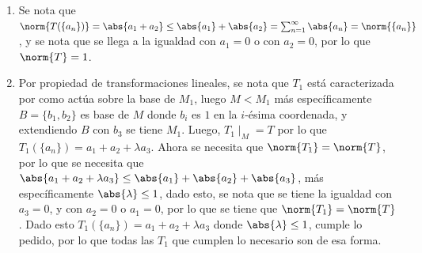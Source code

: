 \begin{sol}
    \begin{enumerate}
        \item Se nota que \(\norm{T(\{a_n\})}=\abs{a_1+a_2}\leq\abs{a_1}+\abs{a_2}=\sum_{n=1}^\infty\abs{a_n}=\norm{\{a_n\}}\), y se nota que se llega a la igualdad con \(a_1=0\) o con \(a_2=0\), por lo que \(\norm{T}=1\).
        \item Por propiedad de transformaciones lineales, se nota que \(T_1\) está caracterizada por como actúa sobre la base de \(M_1\), luego \(M<M_1\) más específicamente \(B=\{b_1,b_2\}\) es base de \(M\) donde \(b_i\) es \(1\) en la \(i\)-ésima coordenada, y extendiendo \(B\) con \(b_3\) se tiene \(M_1\). Luego, \(T_1\mid_M=T\) por lo que \(T_1(\{a_n\})=a_1+a_2+\lambda a_3\). Ahora se necesita que \(\norm{T_1}=\norm{T}\), por lo que se necesita que \(\abs{a_1+a_2+\lambda a_3}\leq\abs{a_1}+\abs{a_2}+\abs{a_3}\), más específicamente \(\abs{\lambda}\leq 1\), dado esto, se nota que se tiene la igualdad con \(a_3=0\), y con \(a_2=0\) o \(a_1=0\), por lo que se tiene que \(\norm{T_1}=\norm{T}\). Dado esto \(T_1(\{a_n\})=a_1+a_2+\lambda a_3\) donde \(\abs{\lambda}\leq 1\), cumple lo pedido, por lo que todas las \(T_1\) que cumplen lo necesario son de esa forma.
    \end{enumerate}
\end{sol}

